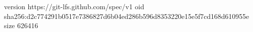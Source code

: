 version https://git-lfs.github.com/spec/v1
oid sha256:d2c774291b0517e7386827d6b04ed286b596d8353220e15e5f7cd168d610955e
size 626416
